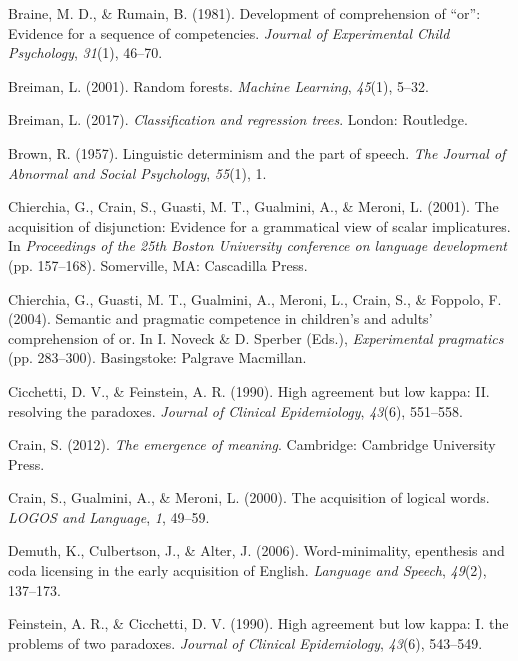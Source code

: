 \documentclass[floatsintext,man]{apa6}
\theoremstyle{definition}
\theoremstyle{definition}
\theoremstyle{definition}
\theoremstyle{remark}
\begin{document}
\hypertarget{refs}{}
\hypertarget{ref-braine1981development}{}
Braine, M. D., \& Rumain, B. (1981). Development of comprehension of
``or'': Evidence for a sequence of competencies. \emph{Journal of
Experimental Child Psychology}, \emph{31}(1), 46--70.

\hypertarget{ref-breiman2001random}{}
Breiman, L. (2001). Random forests. \emph{Machine Learning},
\emph{45}(1), 5--32.

\hypertarget{ref-breiman2017classification}{}
Breiman, L. (2017). \emph{Classification and regression trees}. London:
Routledge.

\hypertarget{ref-brown1957linguistic}{}
Brown, R. (1957). Linguistic determinism and the part of speech.
\emph{The Journal of Abnormal and Social Psychology}, \emph{55}(1), 1.

\hypertarget{ref-chierchia2001acquisition}{}
Chierchia, G., Crain, S., Guasti, M. T., Gualmini, A., \& Meroni, L.
(2001). The acquisition of disjunction: Evidence for a grammatical view
of scalar implicatures. In \emph{Proceedings of the 25th Boston
University conference on language development} (pp. 157--168).
Somerville, MA: Cascadilla Press.

\hypertarget{ref-chierchia2004semantic}{}
Chierchia, G., Guasti, M. T., Gualmini, A., Meroni, L., Crain, S., \&
Foppolo, F. (2004). Semantic and pragmatic competence in children's and
adults' comprehension of or. In I. Noveck \& D. Sperber (Eds.),
\emph{Experimental pragmatics} (pp. 283--300). Basingstoke: Palgrave
Macmillan.

\hypertarget{ref-cicchetti1990high}{}
Cicchetti, D. V., \& Feinstein, A. R. (1990). High agreement but low
kappa: II. resolving the paradoxes. \emph{Journal of Clinical
Epidemiology}, \emph{43}(6), 551--558.

\hypertarget{ref-crain2012emergence}{}
Crain, S. (2012). \emph{The emergence of meaning}. Cambridge: Cambridge
University Press.

\hypertarget{ref-crain2000acquisition}{}
Crain, S., Gualmini, A., \& Meroni, L. (2000). The acquisition of
logical words. \emph{LOGOS and Language}, \emph{1}, 49--59.

\hypertarget{ref-demuth2006word}{}
Demuth, K., Culbertson, J., \& Alter, J. (2006). Word-minimality,
epenthesis and coda licensing in the early acquisition of English.
\emph{Language and Speech}, \emph{49}(2), 137--173.

\hypertarget{ref-feinstein1990high}{}
Feinstein, A. R., \& Cicchetti, D. V. (1990). High agreement but low
kappa: I. the problems of two paradoxes. \emph{Journal of Clinical
Epidemiology}, \emph{43}(6), 543--549.
\end{document}
